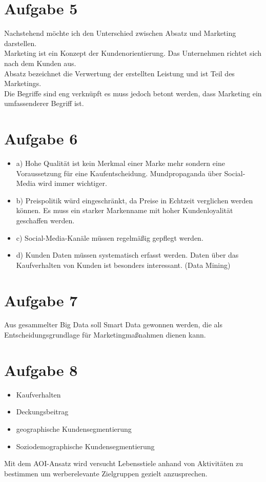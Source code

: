 \documentclass{article}
\begin{document}
	\section*{Aufgabe 5}
	Nachstehend möchte ich den Unterschied zwischen Absatz und Marketing darstellen. \\
	Marketing ist ein Konzept der Kundenorientierung. Das Unternehmen richtet sich nach dem Kunden aus. \\
	Absatz bezeichnet die Verwertung der erstellten Leistung und ist Teil des Marketings. \\
	Die Begriffe sind eng verknüpft es muss jedoch betont werden, dass Marketing ein umfassenderer Begriff ist.
	\section*{Aufgabe 6}
	\begin{itemize}
		\item a) Hohe Qualität ist kein Merkmal einer Marke mehr sondern eine Voraussetzung für eine Kaufentscheidung. Mundpropaganda über Social-Media wird immer wichtiger.
		\item b) Preispolitik würd eingeschränkt, da Preise in Echtzeit verglichen werden können. Es muss ein starker Markenname mit hoher Kundenloyalität geschaffen werden. 
		\item c) Social-Media-Kanäle müssen regelmäßig gepflegt werden.
		\item d) Kunden Daten müssen systematisch erfasst werden. Daten über das Kaufverhalten von Kunden ist besonders interessant. (Data Mining)
	\end{itemize}
	\section*{Aufgabe 7}
	Aus gesammelter Big Data soll Smart Data gewonnen werden, die als Entscheidungsgrundlage für Marketingmaßnahmen dienen kann.
	\section*{Aufgabe 8}
	\begin{itemize}
		\item Kaufverhalten
		\item Deckungsbeitrag
		\item geographische Kundensegmentierung
		\item Soziodemographische Kundensegmentierung
	\end{itemize}
	Mit dem AOI-Ansatz wird versucht Lebensstiele anhand von Aktivitäten zu bestimmen um werberelevante Zielgruppen gezielt anzusprechen. 
\end{document}
